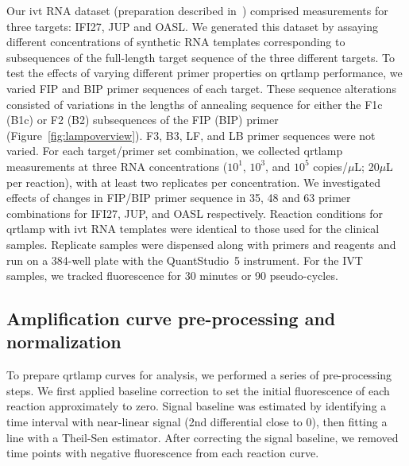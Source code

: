 \documentclass[../thesis.tex]{subfiles}
\begin{document}
Our \gls{ivt} RNA dataset (preparation described in~\citet{remmel_diagnostic_2022}) comprised measurements for three targets: {IFI27}, {JUP} and {OASL}. We generated this dataset by assaying different concentrations of synthetic RNA templates corresponding to subsequences of the full-length target sequence of the three different targets. To test the effects of varying different primer properties on \gls{qrtlamp} performance, we varied FIP and BIP primer sequences of each target. These sequence alterations consisted of variations in the lengths of annealing sequence for either the F1c (B1c) or F2 (B2) subsequences of the FIP (BIP) primer (Figure~\ref{fig:lampoverview}). F3, B3, LF, and LB primer sequences were not varied. For each target/primer set combination, we collected \gls{qrtlamp} measurements at three RNA concentrations ($10^1$, $10^3$, and $10^5$ copies/$\mu$L; 20$\mu$L per reaction), with at least two replicates per concentration. We investigated effects of changes in FIP/BIP primer sequence in 35, 48 and 63 primer combinations for {IFI27}, {JUP}, and {OASL} respectively. Reaction conditions for \gls{qrtlamp} with \gls{ivt} RNA templates were identical to those used for the clinical samples. Replicate samples were dispensed along with primers and reagents and run on a 384-well plate with the QuantStudio\texttrademark~5 instrument. For the IVT samples, we tracked fluorescence for 30 minutes or 90 pseudo-cycles.


\subsection{Amplification curve pre-processing and normalization \label{sec:curvenormalisation}}
To prepare \gls{qrtlamp} curves for analysis, we performed a series of pre-processing steps. We first applied baseline correction to set the initial fluorescence of each reaction approximately to zero. Signal baseline was estimated by identifying a time interval with near-linear signal (2nd differential close to 0), then fitting a line with a Theil-Sen estimator. After correcting the signal baseline, we removed time points with negative fluorescence from each reaction curve.
\end{document}
